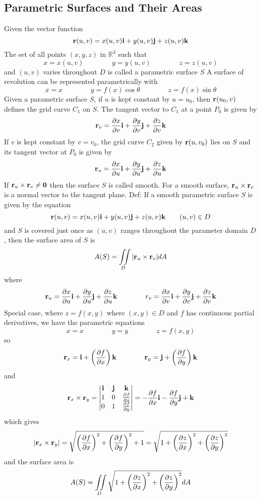 \documentclass{article}
\begin{document}
    \subsection{Parametric Surfaces and Their Areas}
    \begin{outline}
        \1 Given the vector function \[\vb r(u,v)=x(u,v)\vb i+y(u,v)\vb j+z(u,v)\vb k\] The set of all points \((x,y,z)\) in \(\mathbb R^3\) such that \[x=x(u,v)\qquad\qquad y=y(u,v)\qquad\qquad z=z(u,v)\] and \((u,v)\) varies throughout $D$ is called a parametric surface $S$
        \1 A surface of revolution can be represented parametrically with \[x=x\qquad\qquad y=f(x)\cos\theta\qquad\qquad z=f(x)\sin\theta\]
        \1 Given a parametric surface $S$, if \(u\) is kept constant by \(u=u_0\), then \(\vb r(u_0,v)\) defines the grid curve \(C_1\) on \(S\). The tangent vector to \(C_1\) at a point \(P_0\) is given by \[\vb r_v=\pdv{x}{v}(u_0,v_0)\vb i+\pdv{y}{v}(u_0,v_0)\vb j+\pdv{z}{v}(u_0,v_0)\vb k\] If $v$ is kept constant by \(v=v_0\), the grid curve \(C_2\) given by \(\vb r(u,v_0)\) lies on $S$ and its tangent vector at \(P_0\) is given by \[\vb r_u=\pdv{x}{u}(u_0,v_0)\vb i+\pdv{y}{u}(u_0,v_0)\vb j+\pdv{z}{u}(u_0,v_0)\vb k\] If \(\vb r_u\times\vb r_v\neq\vb 0\) then the surface $S$ is called smooth. For a smooth surface, \(\vb r_u\times\vb r_v\) is a normal vector to the tangent plane. 
        \1 Def: If a smooth parametric surface $S$ is given by the equation \[\vb r(u,v)=x(u,v)\vb i+y(u,v)\vb j+z(u,v)\vb k\qquad(u,v)\in D\] and $S$ is covered just once as \((u,v)\) ranges throughout the parameter domain $D$, then the surface area of $S$ is \[A(S)=\iint\limits_D|\vb r_u\times\vb r_v|dA\] where \[\vb r_u=\pdv{x}{u}\vb i+\pdv{y}{u}\vb j+\pdv{z}{u}\vb k\qquad\qquad r_v=\pdv{x}{v}\vb i+\pdv{y}{v}\vb j+\pdv{z}{v}\vb k\]
        \1 Special case, where \(z=f(x,y)\) where \((x,y)\in D\) and \(f\) has continuous partial derivatives, we have the parametric equations \[x=x\qquad\qquad y=y\qquad\qquad z=f(x,y)\] so \[\vb r_x=\vb i+\left(\pdv{f}{x}\right)\vb k\qquad\qquad\vb r_y=\vb j+\left(\pdv{f}{y}\right)\vb k\] and \[\vb r_x\times\vb r_y=\begin{vmatrix}\vb i & \vb j & \vb k \\ 1 & 0 & \pdv{f}{x} \\ 0 & 1 & \pdv{f}{y}\end{vmatrix}=-\pdv{f}{x}\vb i-\pdv{f}{y}\vb j+\vb k\] which gives \[|\vb r_x\times\vb r_y|=\sqrt{\left(\pdv{f}{x}\right)^2+\left(\pdv{f}{y}\right)^2+1}=\sqrt{1+\left(\pdv{z}{x}\right)^2+\left(\pdv{z}{y}\right)^2}\] and the surface area is \[A(S)=\iint\limits_D\sqrt{1+\left(\pdv{z}{x}\right)^2+\left(\pdv{z}{y}\right)^2}dA\]

    \end{outline}
\end{document}
